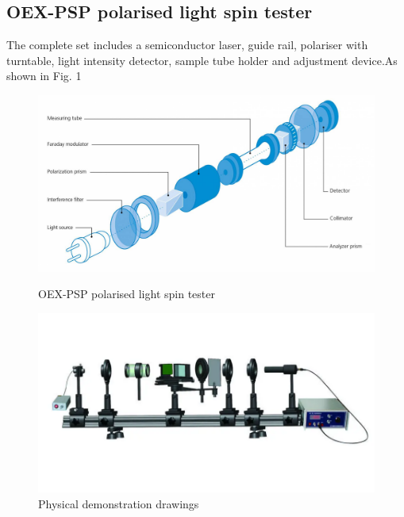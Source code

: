 \documentclass[UTF8]{article}
\begin{document}
		\subsection{OEX-PSP polarised light spin tester}
	 The complete set includes a semiconductor laser, guide rail, polariser with turntable, light intensity detector, sample tube holder and adjustment device.As shown in Fig. 1
	\begin{figure}[H]
	    \begin{minipage}[t]{0.5\linewidth}
	    	\centering
	    	\includegraphics[clip,scale=0.1]{figure/fig1.jpg}
	    	\caption{OEX-PSP polarised light spin tester}
	    	\label{figure.1}
	    \end{minipage}
        \begin{minipage}[t]{0.5\linewidth}
        	\centering
        	\includegraphics[clip,scale=0.8,trim={0 30 0 0}]{figure/fig2.png}
        	\caption{Physical demonstration drawings}
        	\label{figure.2}
        \end{minipage}
		\end{figure}
\end{document}
